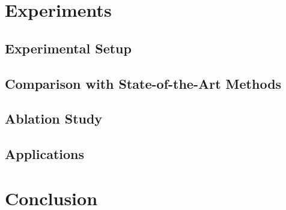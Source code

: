 \documentclass{article}
\begin{document}
\section{Experiments}
\label{sec:exp}

\subsection{Experimental Setup}

\subsection{Comparison with State-of-the-Art Methods}

\subsection{Ablation Study}

\subsection{Applications}  %

\section{Conclusion}
\label{sec:conclusion}


\end{document}
